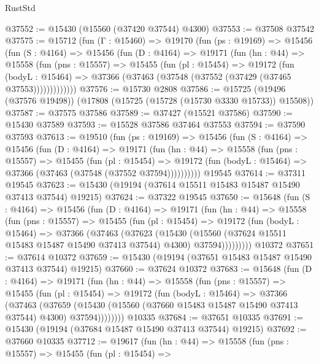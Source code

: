 \begin{lexlean}{RustStd}
\begin{coremodule}
{\begin{coremodule}
{{{{{{{{{{{{{{{{{{{{{{{{{{{{{{{{{{{{{{{{{{{{{{{{{{{{{{{{{{{{@37552 := @15430 (@15560 (@37420 @37544) @4300)
@37553 := @37508 @37542
@37575 := @15712
    (fun (Γ : @15460) =>
    @19170
      (fun (ps : @19169) =>
      @15456
        (fun (S : @4164) =>
        @15456
          (fun (D : @4164) =>
          @19171
            (fun (hn : @44) =>
            @15558
              (fun (pns : @15557) =>
              @15455
                (fun (pl : @15454) =>
                @19172
                  (fun (bodyL : @15464) =>
                  @37366 (@37463 (@37548 (@37552 (@37429 (@37465 @37553)))))))))))))
@37576 := @15730 @2808
@37586 := @15725 (@19496 (@37576 @19498)) (@17808 (@15725 (@15728 (@15730 @3330 @15733)) @15508))
@37587 := @37575 @37586
@37589 := @37427 (@15521 @37586)
@37590 := @15430 @37589
@37593 := @15528 @37586 @37464 @37553
@37594 := @37590 @37593
@37613 := @19510
    (fun (ps : @19169) =>
    @15456
      (fun (S : @4164) =>
      @15456
        (fun (D : @4164) =>
        @19171
          (fun (hn : @44) =>
          @15558
            (fun (pns : @15557) =>
            @15455
              (fun (pl : @15454) =>
              @19172 (fun (bodyL : @15464) => @37366 (@37463 (@37548 (@37552 @37594))))))))))
    @19545
@37614 := @37311 @19545
@37623 := @15430 (@19194 (@37614 @15511 @15483 @15487 @15490 @37413 @37544) @19215)
@37624 := @37322 @19545
@37650 := @15648
    (fun (S : @4164) =>
    @15456
      (fun (D : @4164) =>
      @19171
        (fun (hn : @44) =>
        @15558
          (fun (pns : @15557) =>
          @15455
            (fun (pl : @15454) =>
            @19172
              (fun (bodyL : @15464) =>
              @37366
                (@37463
                  (@37623
                    (@15430
                      (@15560 (@37624 @15511 @15483 @15487 @15490 @37413 @37544) @4300)
                      @37594)))))))))
    @10372
@37651 := @37614 @10372
@37659 := @15430 (@19194 (@37651 @15483 @15487 @15490 @37413 @37544) @19215)
@37660 := @37624 @10372
@37683 := @15648
    (fun (D : @4164) =>
    @19171
      (fun (hn : @44) =>
      @15558
        (fun (pns : @15557) =>
        @15455
          (fun (pl : @15454) =>
          @19172
            (fun (bodyL : @15464) =>
            @37366
              (@37463
                (@37659
                  (@15430 (@15560 (@37660 @15483 @15487 @15490 @37413 @37544) @4300) @37594))))))))
    @10335
@37684 := @37651 @10335
@37691 := @15430 (@19194 (@37684 @15487 @15490 @37413 @37544) @19215)
@37692 := @37660 @10335
@37712 := @19617
    (fun (hn : @44) =>
    @15558
      (fun (pns : @15557) =>
      @15455
        (fun (pl : @15454) =>
}}}}}}}}}}}}}}}}}}}}}}}}}}}}}}}}}}}}}}}}}}}}}}}}}}}}}}}}}}}}
\end{coremodule}}
\end{coremodule}
\end{lexlean}
